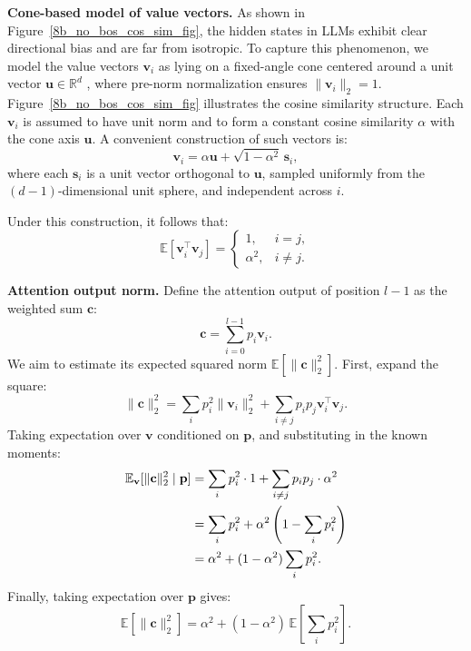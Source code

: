 \documentclass[]{template}
\theoremstyle{plain}
\theoremstyle{definition}
\theoremstyle{remark}
\renewcommand{\paragraph}[1]{\vspace{1mm}\noindent\textbf{#1}}
\begin{document}
\paragraph{Cone-based model of value vectors.}
As shown in Figure~\ref{8b_no_bos_cos_sim_fig}, the hidden states in LLMs exhibit clear directional bias and are far from isotropic. To capture this phenomenon, we model the value vectors $\mathbf{v}_i$ as lying on a fixed-angle cone centered around a unit vector $\mathbf{u} \in \mathbb{R}^d$ , where pre-norm normalization ensures $\|\mathbf{v}_i\|_2 = 1$. Figure~\ref{8b_no_bos_cos_sim_fig} illustrates the cosine similarity structure. Each $\mathbf{v}_i$ is assumed to have unit norm and to form a constant cosine similarity $\alpha$ with the cone axis $\mathbf{u}$. A convenient construction of such vectors is:
\begin{equation}
\mathbf{v}_i = \alpha \mathbf{u} + \sqrt{1 - \alpha^2} \, \mathbf{s}_i,
\end{equation}
where each $\mathbf{s}_i$ is a unit vector orthogonal to $\mathbf{u}$, sampled uniformly from the $(d-1)$-dimensional unit sphere, and independent across $i$.

Under this construction, it follows that:
\begin{equation}
\mathbb{E}[\mathbf{v}_i^\top \mathbf{v}_j] = 
\begin{cases}
1, & i = j, \\
\alpha^2, & i \neq j.
\end{cases}
\end{equation}

\paragraph{Attention output norm.}  
Define the attention output of position $l-1$ as the weighted sum $\mathbf{c}$:
\begin{equation}
\mathbf{c} = \sum_{i=0}^{l-1} p_i \mathbf{v}_i.
\end{equation}
We aim to estimate its expected squared norm $\mathbb{E}[\|\mathbf{c}\|_2^2]$. First, expand the square:
\begin{equation}
\|\mathbf{c}\|_2^2 = \sum_i p_i^2 \|\mathbf{v}_i\|_2^2 + \sum_{i \ne j} p_i p_j \mathbf{v}_i^\top \mathbf{v}_j.
\end{equation}
Taking expectation over $\mathbf{v}$ conditioned on $\mathbf{p}$, and substituting in the known moments:
\begin{align}
\mathbb{E}_{\mathbf{v}}[\|\mathbf{c}\|_2^2 \mid \mathbf{p}]
&= \sum_i p_i^2 \cdot 1 + \sum_{i \ne j} p_i p_j \cdot \alpha^2 \notag \\
&= \sum_i p_i^2 + \alpha^2 \left( 1 - \sum_i p_i^2 \right) \notag \\
&= \alpha^2 + (1 - \alpha^2) \sum_i p_i^2.
\end{align}
Finally, taking expectation over $\mathbf{p}$ gives:
\begin{equation}
\mathbb{E}[\|\mathbf{c}\|_2^2]
= \alpha^2 + (1 - \alpha^2)\, \mathbb{E}\left[\sum_i p_i^2\right].
\label{eq:mixing}
\end{equation}
\end{document}

